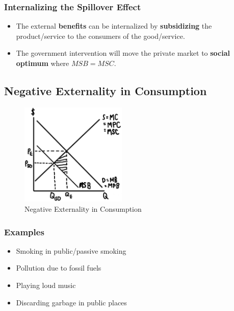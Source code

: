 \documentclass[
  letterpaper,
  DIV=11,
  numbers=noendperiod]{scrartcl}
\providecommand{\tightlist}{%
  \setlength{\itemsep}{0pt}\setlength{\parskip}{0pt}}\usepackage{longtable,booktabs,array}
\begin{document}
\hypertarget{internalizing-the-spillover-effect}{%
\subsubsection{Internalizing the Spillover
Effect}\label{internalizing-the-spillover-effect}}

\begin{itemize}
\tightlist
\item
  The external \textbf{benefits} can be internalized by
  \textbf{subsidizing} the product/service to the consumers of the
  good/service.
\item
  The government intervention will move the private market to
  \textbf{social optimum} where \(MSB = MSC\).
\end{itemize}

\newpage{}

\hypertarget{negative-externality-in-consumption}{%
\subsection{Negative Externality in
Consumption}\label{negative-externality-in-consumption}}

\begin{figure}

{\centering \includegraphics[width=0.45\textwidth,height=\textheight]{img/neg-cons.png}

}

\caption{Negative Externality in Consumption}

\end{figure}

\hypertarget{examples-3}{%
\subsubsection{Examples}\label{examples-3}}

\begin{itemize}
\tightlist
\item
  Smoking in public/passive smoking
\item
  Pollution due to fossil fuels
\item
  Playing loud music
\item
  Discarding garbage in public places
\end{itemize}
\end{document}
